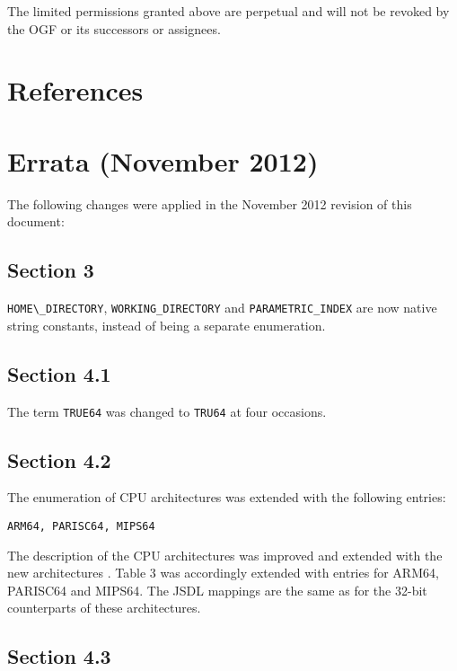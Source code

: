 \documentclass{article}
\newcommand{\h}[1]{\lstinline|#1|}
\begin{document}
 The limited permissions granted above are perpetual and will not be
 revoked by the OGF or its successors or assignees. 


\section{References}
\renewcommand{\refname}{}
\vspace*{-3em}


\newpage
\appendix
\section{Errata (November 2012)}
\label{sec:errata}

The following changes were applied in the November 2012 revision of this document:

\subsection*{Section 3}

\h{HOME\_DIRECTORY}, \h{WORKING_DIRECTORY} and \h{PARAMETRIC_INDEX} are now native string constants, instead of being a separate enumeration.

\subsection*{Section 4.1}

The term \h{TRUE64} was changed to \h{TRU64} at four occasions.

\subsection*{Section 4.2}

The enumeration of CPU architectures was extended with the following entries:

\h{ARM64, PARISC64, MIPS64} 

The description of the CPU architectures was improved and extended with the new architectures .
Table 3 was accordingly extended with entries for ARM64, PARISC64 and MIPS64. The JSDL mappings are the same as for the 32-bit counterparts of these architectures.

\subsection*{Section 4.3}
\end{document}
